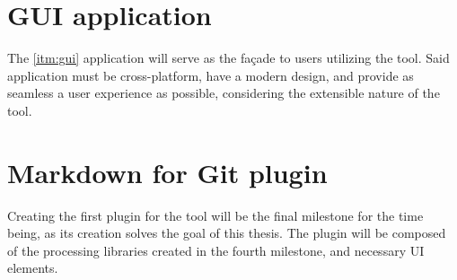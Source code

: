\section{GUI application} \label{secGuiApp}

The \ref{itm:gui} application will serve as the façade to users utilizing the tool. Said application must be cross-platform, have a modern design, and provide as seamless a user experience as possible, considering the extensible nature of the tool.

\section{Markdown for Git plugin} \label{secMdGitPlugin}

Creating the first plugin for the tool will be the final milestone for the time being, as its creation solves the goal of this thesis.
The plugin will be composed of the processing libraries created in the fourth milestone, and necessary UI elements.